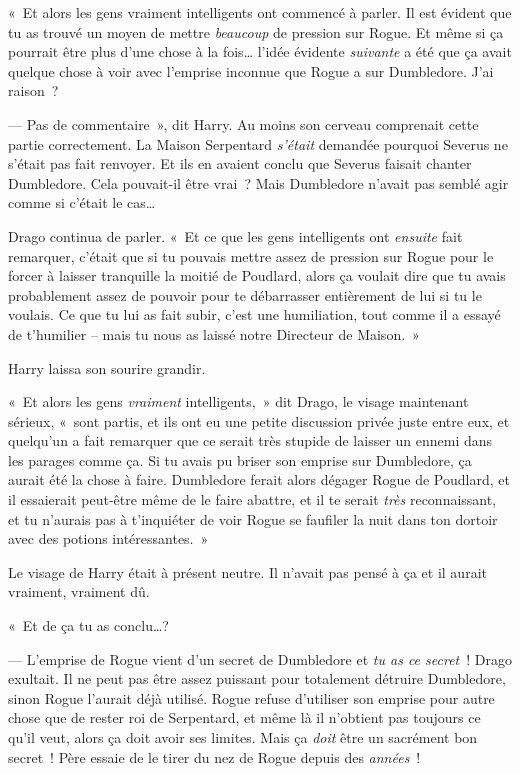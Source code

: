 «~Et alors les gens vraiment intelligents ont commencé à parler.
Il est évident que tu as trouvé un moyen de mettre \emph{beaucoup} de pression sur Rogue.
Et même si ça pourrait être plus d'une chose à la fois… l'idée évidente \emph{suivante} a été que ça avait quelque chose à voir avec l'emprise inconnue que Rogue a sur Dumbledore.
J'ai raison~?

--- Pas de commentaire~», dit Harry.
Au moins son cerveau comprenait cette partie correctement.
La Maison Serpentard \emph{s'était} demandée pourquoi Severus ne s'était pas fait renvoyer.
Et ils en avaient conclu que Severus faisait chanter Dumbledore.
Cela pouvait-il être vrai~?
Mais Dumbledore n'avait pas semblé agir comme si c'était le cas…

Drago continua de parler.
«~Et ce que les gens intelligents ont \emph{ensuite} fait remarquer, c'était que si tu pouvais mettre assez de pression sur Rogue pour le forcer à laisser tranquille la moitié de Poudlard, alors ça voulait dire que tu avais probablement assez de pouvoir pour te débarrasser entièrement de lui si tu le voulais.
Ce que tu lui as fait subir, c'est une humiliation, tout comme il a essayé de t'humilier -- mais tu nous as laissé notre Directeur de Maison.~»

Harry laissa son sourire grandir.

«~Et alors les gens \emph{vraiment} intelligents,~» dit Drago, le visage maintenant sérieux, «~sont partis, et ils ont eu une petite discussion privée juste entre eux, et quelqu'un a fait remarquer que ce serait très stupide de laisser un ennemi dans les parages comme ça.
Si tu avais pu briser son emprise sur Dumbledore, ça aurait été la chose à faire.
Dumbledore ferait alors dégager Rogue de Poudlard, et il essaierait peut-être même de le faire abattre, et il te serait \emph{très} reconnaissant, et tu n'aurais pas à t'inquiéter de voir Rogue se faufiler la nuit dans ton dortoir avec des potions intéressantes.~»

Le visage de Harry était à présent neutre.
Il n'avait pas pensé à ça et il aurait vraiment, vraiment dû.

«~Et de ça tu as conclu…?

--- L'emprise de Rogue vient d'un secret de Dumbledore et \emph{tu as ce secret}~!
Drago exultait.
Il ne peut pas être assez puissant pour totalement détruire Dumbledore, sinon Rogue l'aurait déjà utilisé.
Rogue refuse d'utiliser son emprise pour autre chose que de rester roi de Serpentard, et même là il n'obtient pas toujours ce qu'il veut, alors ça doit avoir ses limites.
Mais ça \emph{doit} être un sacrément bon secret~!
Père essaie de le tirer du nez de Rogue depuis des \emph{années}~!

